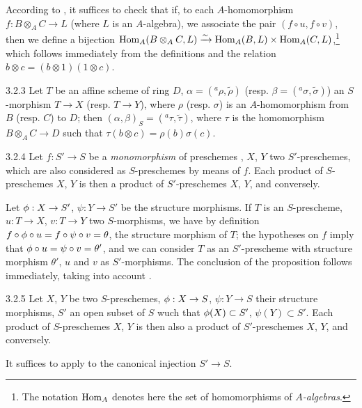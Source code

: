 According to , it suffices to check that if, to each $A$-homomorphism
$f:B\otimes_A C\to L$ (where $L$ is an $A$-algebra), we associate the pair
$(f\circ u,f\circ v)$, then we define a bijection
${\mathop{\mathrm{Hom}}\nolimits}_A(B\otimes_A C,L)\xrightarrow{\sim}{\mathop{\mathrm{Hom}}\nolimits}_A(B,L)\times{\mathop{\mathrm{Hom}}\nolimits}_A(C,L)$,\footnote{The notation ${\mathop{\mathrm{Hom}}\nolimits}_A$
denotes here the set of homomorphisms of \emph{$A$-algebras}.} which follows immediately
from the definitions and the relation $b\otimes c=(b\otimes 1)(1\otimes c)$.

\begin{envs}[Corollary]{3.2.3}
\label{cor-1.3.2.3}
Let $T$ be an affine scheme of ring $D$, $\alpha=({}^a\rho,\widetilde{\rho})$
(resp. $\beta=({}^a\sigma,\widetilde{\sigma})$) an $S$-morphism $T\to X$ (resp. $T\to Y$),
where $\rho$ (resp. $\sigma$) is an $A$-homomorphism from $B$ (resp. $C$) to $D$; then
$(\alpha,\beta)_S=({}^a\tau,\widetilde{\tau})$, where $\tau$ is the homomorphism
$B\otimes_A C\to D$ such that $\tau(b\otimes c)=\rho(b)\sigma(c)$.
\end{envs}

\begin{envs}[Proposition]{3.2.4}
\label{prop-1.3.2.4}
Let $f:S'\to S$ be a \emph{monomorphism} of preschemes , $X$, $Y$ two
$S'$-preschemes, which are also considered as $S$-preschemes by means of $f$. Each product of
$S$-preschemes $X$, $Y$ is then a product of $S'$-preschemes $X$, $Y$, and conversely.
\end{envs}

Let $\phi:X\to S'$, $\psi:Y\to S'$ be the structure morphisms. If $T$ is an $S$-prescheme,
$u:T\to X$, $v:T\to Y$ two $S$-morphisms, we have by definition
$f\circ\phi\circ u=f\circ\psi\circ v=\theta$, the structure morphism of $T$; the hypotheses
on $f$ imply that $\phi\circ u=\psi\circ v=\theta'$, and we can consider $T$ as an
$S'$-prescheme with structure morphism $\theta'$, $u$ and $v$ as $S'$-morphisms. The
conclusion of the proposition follows immediately, taking into account .

\begin{envs}[Corollary]{3.2.5}
\label{cor-1.3.2.5}
Let $X$, $Y$ be two $S$-preschemes, $\phi:X\to S$, $\psi:Y\to S$ their structure morphisms,
$S'$ an open subset of $S$ wuch that $\phi(X)\subset S'$, $\psi(Y)\subset S'$. Each product
of $S$-preschemes $X$, $Y$ is then also a product of $S'$-preschemes $X$, $Y$, and
conversely.
\end{envs}

It suffices to apply  to the canonical injection $S'\to S$.

